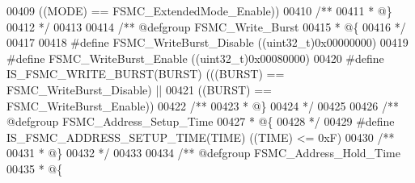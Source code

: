 \begin{DoxyCode}
00409                                      \textcolor{preprocessor}{(}\textcolor{preprocessor}{(}\textcolor{preprocessor}{MODE}\textcolor{preprocessor}{)} \textcolor{preprocessor}{==} FSMC_ExtendedMode_Enable\textcolor{preprocessor}{)}\textcolor{preprocessor}{)}
00410 \textcolor{comment}{/**}
00411 \textcolor{comment}{  * @\}}
00412 \textcolor{comment}{  */}
00413 
00414 \textcolor{comment}{/** @defgroup FSMC\_Write\_Burst }
00415 \textcolor{comment}{  * @\{}
00416 \textcolor{comment}{  */}
00417 
00418 \textcolor{preprocessor}{#}\textcolor{preprocessor}{define} \textcolor{preprocessor}{FSMC\_WriteBurst\_Disable}                  \textcolor{preprocessor}{(}\textcolor{preprocessor}{(}\textcolor{preprocessor}{uint32\_t}\textcolor{preprocessor}{)}0x00000000\textcolor{preprocessor}{)}
00419 \textcolor{preprocessor}{#}\textcolor{preprocessor}{define} \textcolor{preprocessor}{FSMC\_WriteBurst\_Enable}                   \textcolor{preprocessor}{(}\textcolor{preprocessor}{(}\textcolor{preprocessor}{uint32\_t}\textcolor{preprocessor}{)}0x00080000\textcolor{preprocessor}{)}
00420 \textcolor{preprocessor}{#}\textcolor{preprocessor}{define} \textcolor{preprocessor}{IS\_FSMC\_WRITE\_BURST}\textcolor{preprocessor}{(}\textcolor{preprocessor}{BURST}\textcolor{preprocessor}{)} \textcolor{preprocessor}{(}\textcolor{preprocessor}{(}\textcolor{preprocessor}{(}\textcolor{preprocessor}{BURST}\textcolor{preprocessor}{)} \textcolor{preprocessor}{==} FSMC_WriteBurst_Disable\textcolor{preprocessor}{)} \textcolor{preprocessor}{||}
00421                                     \textcolor{preprocessor}{(}\textcolor{preprocessor}{(}\textcolor{preprocessor}{BURST}\textcolor{preprocessor}{)} \textcolor{preprocessor}{==} FSMC_WriteBurst_Enable\textcolor{preprocessor}{)}\textcolor{preprocessor}{)}
00422 \textcolor{comment}{/**}
00423 \textcolor{comment}{  * @\}}
00424 \textcolor{comment}{  */}
00425 
00426 \textcolor{comment}{/** @defgroup FSMC\_Address\_Setup\_Time }
00427 \textcolor{comment}{  * @\{}
00428 \textcolor{comment}{  */}
00429 \textcolor{preprocessor}{#}\textcolor{preprocessor}{define} \textcolor{preprocessor}{IS\_FSMC\_ADDRESS\_SETUP\_TIME}\textcolor{preprocessor}{(}\textcolor{preprocessor}{TIME}\textcolor{preprocessor}{)} \textcolor{preprocessor}{(}\textcolor{preprocessor}{(}\textcolor{preprocessor}{TIME}\textcolor{preprocessor}{)} \textcolor{preprocessor}{<=} 0xF\textcolor{preprocessor}{)}
00430 \textcolor{comment}{/**}
00431 \textcolor{comment}{  * @\}}
00432 \textcolor{comment}{  */}
00433 
00434 \textcolor{comment}{/** @defgroup FSMC\_Address\_Hold\_Time }
00435 \textcolor{comment}{  * @\{}

\end{DoxyCode}
